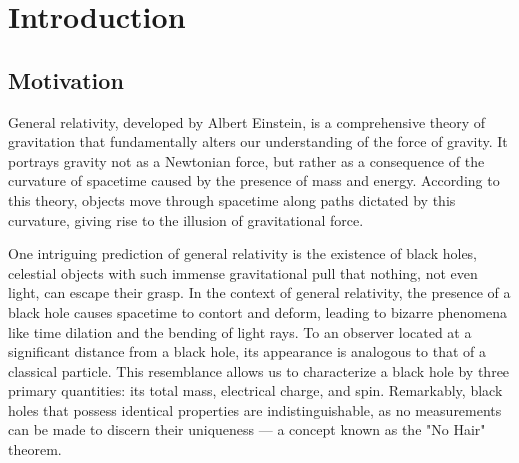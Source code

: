 
\chapter{Introduction}
\label{chapter:introduction}

\section{Motivation}
\label{section:motivation}

General relativity, developed by Albert Einstein, is a comprehensive theory of gravitation that fundamentally alters our understanding of the force of gravity. It portrays gravity not as a Newtonian force, but rather as a consequence of the curvature of spacetime caused by the presence of mass and energy. According to this theory, objects move through spacetime along paths dictated by this curvature, giving rise to the illusion of gravitational force.

One intriguing prediction of general relativity is the existence of black holes, celestial objects with such immense gravitational pull that nothing, not even light, can escape their grasp. In the context of general relativity, the presence of a black hole causes spacetime to contort and deform, leading to bizarre phenomena like time dilation and the bending of light rays. To an observer located at a significant distance from a black hole, its appearance is analogous to that of a classical particle. This resemblance allows us to characterize a black hole by three primary quantities: its total mass, electrical charge, and spin. Remarkably, black holes that possess identical properties are indistinguishable, as no measurements can be made to discern their uniqueness \cite{HawMalStr16} — a concept known as the "No Hair" theorem.

